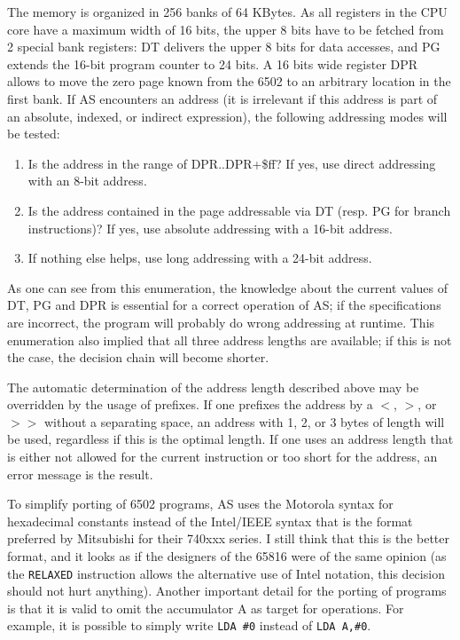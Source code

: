 \documentclass[12pt,twoside]{report}
\newcommand{\tty}[1]{{\tt #1}}
\begin{document}
The memory is organized in 256 banks of 64 KBytes.  As all registers
in the CPU core have a maximum width of 16 bits, the upper 8 bits
have to be fetched from 2 special bank registers: DT delivers the
upper 8 bits for data accesses, and PG extends the 16-bit program
counter to 24 bits.  A 16 bits wide register DPR allows to move the
zero page known from the 6502 to an arbitrary location in the first
bank.  If AS encounters an address (it is irrelevant if this address
is part of an absolute, indexed, or indirect expression), the
following addressing modes will be tested:
\begin{enumerate}
\item{Is the address in the range of DPR..DPR+\$ff?  If yes, use direct
      addressing with an 8-bit address.}
\item{Is the address contained in the page addressable via DT (resp.
      PG for branch instructions)? If yes, use absolute addressing
      with a 16-bit address.}
\item{If nothing else helps, use long addressing with a 24-bit
      address.}
\end{enumerate}
As one can see from this enumeration, the knowledge about the current
values of DT, PG and DPR is essential for a correct operation of AS;
if the specifications are incorrect, the program will probably do
wrong addressing at runtime.  This enumeration also implied that all
three address lengths are available; if this is not the case, the
decision chain will become shorter.

The automatic determination of the address length described above may
be overridden by the usage of prefixes.  If one prefixes the address
by a $<$, $>$, or $>>$ without a separating space, an address with 1, 2, or
3 bytes of length will be used, regardless if this is the optimal
length.  If one uses an address length that is either not allowed for
the current instruction or too short for the address, an error
message is the result.

To simplify porting of 6502 programs, AS uses the Motorola syntax for
hexadecimal constants instead of the Intel/IEEE syntax that is
the format preferred by Mitsubishi for their 740xxx series.  I still
think that this is the better format, and it looks as if the
designers of the 65816 were of the same opinion (as the \tty{RELAXED}
instruction allows the alternative use of Intel notation, this
decision should not hurt anything).  Another important detail for the
porting of programs is that it is valid to omit the accumulator A as
target for operations.  For example, it is possible to simply write
\verb!LDA #0! instead of \verb!LDA A,#0!.
\end{document}
